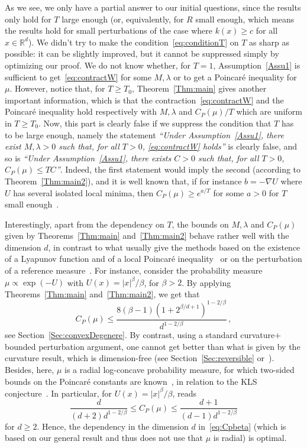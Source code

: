 \documentclass[AHL,Unicode,longabstracts,published]{cedram}
\newcommand{\R}{\mathbb R}
\newcommand{\na}{\nabla}
\newcommand{\1}{\mathbbm{1}}
\newcommand{\R}{\mathbb R}
\begin{document}
As we see, we only have a partial answer to our initial questions, since the results only hold for $T$ large enough (or, equivalently, for $R$ small enough, which means the results hold for small perturbations of the case where $k(x)\geqslant c$ for all $x\in\R^d$). We didn't try to make the condition~\eqref{eq:conditionT} on $T$ as sharp as possible: it can be slightly improved, but it cannot be suppressed simply by optimizing our proof. We do not know whether, for $T=1$, Assumption~\ref{Assu1} is sufficient to get~\eqref{eq:contractW} for some $M,\lambda$ or to get a Poincaré inequality for $\mu$. However, notice that, for $T\geqslant T_0$, Theorem~\ref{Thm:main} gives another important information, which is that the contraction~\eqref{eq:contractW} and the Poincaré inequality hold respectively with $M,\lambda$ and $C_P(\mu)/T$ which are uniform in $T\geqslant T_0$. Now, this part is clearly false if we suppress the condition that $T$ has to be large enough, namely the statement \emph{``Under Assumption~\ref{Assu1}, there exist $M,\lambda>0$ such that, for all $T>0$, \eqref{eq:contractW} holds''} is clearly false, and so is \emph{``Under Assumption~\ref{Assu1}, there exists $C>0$ such that, for all $T>0$, $C_P(\mu) \leqslant TC$''}. Indeed, the first statement would imply the second (according to Theorem~\ref{Thm:main2}), and it is well known that, if for instance $b=-\na U$ where $U$ has several isolated local minima, then $C_P(\mu)\geqslant e^{a/T}$ for some $a>0$ for $T$ small enough~\cite{HKS,MenzSchlichting}.



Interestingly, apart from the dependency on $T$, the bounds on $M,\lambda$ and $ C_P(\mu)$ given by Theorems~\ref{Thm:main} and~\ref{Thm:main2} behave rather well with the dimension $d$, in contrast to what usually give the methods based on the existence of a Lyapunov function and of a local Poincaré inequality~\cite{BakryCattiauxGuillin,CattiauxGuillin} or on the perturbation of a reference measure~\cite{HKS}. For instance, consider the probability measure $\mu\propto \exp(-U)$ with $U(x)=|x|^\beta/\beta$, for $\beta>2$. By applying Theorems~\ref{Thm:main} and~\ref{Thm:main2}, we get that
\begin{equation}\label{eq:Cpbeta}
C_P(\mu) \leqslant \frac{ 8 (\beta-1) \left( 1+ 2^{\beta/d+1} \right)^{1-2/\beta}}{d^{1-2/\beta}}\,,
\end{equation}
see Section~\ref{Sec:convexDegenere}. By contrast, using a standard curvature$+$bounded perturbation argument, one cannot get better than what is given by the curvature result, which is dimension-free (see Section~\ref{Sec:reversible} or~\cite[Remark~5.21]{CattiauxGuillinSLC}). Besides, here, $\mu$ is a radial log-concave probability measure, for which two-sided bounds on the Poincaré constants are known~\cite{BonnefontJoulinMa,Bobkov}, in relation to the KLS conjecture~\cite{ChenKLS,LeeVempala}. In particular, for $U(x) =|x|^\beta/\beta$, \cite[Corollary~4.2]{BonnefontJoulinMa} reads
\[
\frac{d}{(d+2) d^{1-2/\beta}} \leqslant C_P(\mu) \leqslant \frac{d+1}{(d-1) d^{1-2/\beta}}
\]
for $d\geqslant 2$. Hence, the dependency in the dimension $d$ in~\eqref{eq:Cpbeta} (which is based on our general result and thus does not use that $\mu$ is radial) is optimal.
\end{document}

